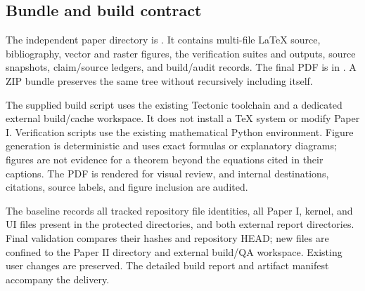 \subsection{Bundle and build contract}
The independent paper directory is . It contains multi-file LaTeX source, bibliography, vector and raster figures, the verification suites and outputs, source snapshots, claim/source ledgers, and build/audit records. The final PDF is in . A ZIP bundle preserves the same tree without recursively including itself.

The supplied build script uses the existing Tectonic toolchain and a dedicated external build/cache workspace. It does not install a TeX system or modify Paper I. Verification scripts use the existing mathematical Python environment. Figure generation is deterministic and uses exact formulas or explanatory diagrams; figures are not evidence for a theorem beyond the equations cited in their captions. The PDF is rendered for visual review, and internal destinations, citations, source labels, and figure inclusion are audited.

The baseline records all tracked repository file identities, all Paper I, kernel, and UI files present in the protected directories, and both external report directories. Final validation compares their hashes and repository HEAD; new files are confined to the Paper II directory and external build/QA workspace. Existing user changes are preserved. The detailed build report and artifact manifest accompany the delivery.
